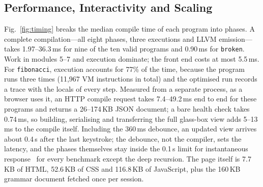 \documentclass[conference]{IEEEtran}
\newcommand{\code}[1]{\texttt{#1}}
\begin{document}
\subsection{Performance, Interactivity and Scaling}
\label{sec:res-perf}
Fig.~\ref{fig:timing} breaks the median compile time of each program into phases. A complete compilation---all eight phases, three executions and LLVM emission---takes 1.97--36.3\,ms for nine of the ten valid programs and 0.90\,ms for \code{broken}. Work in modules 5--7 and execution dominate; the front end costs at most 5.5\,ms. For \code{fibonacci}, execution accounts for 77\% of the time, because the program runs three times (11,967 VM instructions in total) and the optimised run records a trace with the locals of every step. Measured from a separate process, as a browser uses it, an HTTP compile request takes 7.4--49.2\,ms end to end for these programs and returns a 26--174\,KB JSON document; a bare health check takes 0.74\,ms, so building, serialising and transferring the full glass-box view adds 5--13\,ms to the compile itself. Including the 360\,ms debounce, an updated view arrives about 0.4\,s after the last keystroke; the debounce, not the compiler, sets the latency, and the phases themselves stay inside the 0.1\,s limit for instantaneous response~\cite{miller1968} for every benchmark except the deep recursion. The page itself is 7.7\,KB of HTML, 52.6\,KB of CSS and 116.8\,KB of JavaScript, plus the 160\,KB grammar document fetched once per session.
\end{document}

